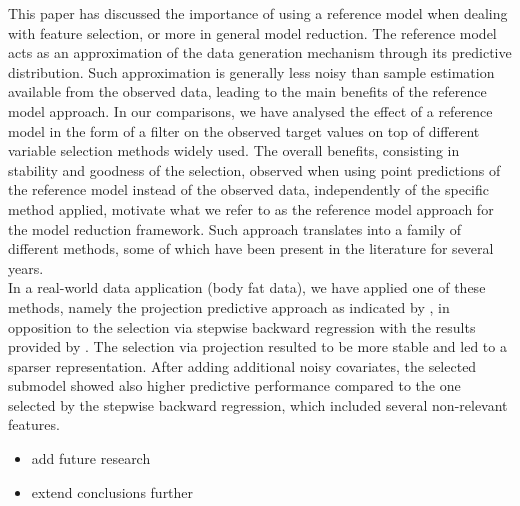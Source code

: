 \documentclass[american,]{article}
\theoremstyle{definition}
\begin{document}
This paper has discussed the importance of using a reference model when dealing with feature selection, or more in general model reduction. The reference model acts as an approximation of the data generation mechanism through its predictive distribution. Such approximation is generally less noisy than sample estimation available from the observed data, leading to the main benefits of the reference model approach. In our comparisons, we have analysed the effect of a reference model in the form of a filter on the observed target values on top of different variable selection methods widely used. The overall benefits, consisting in stability and goodness of the selection, observed when using point predictions of the reference model instead of the observed data, independently of the specific method applied, motivate what we refer to as the reference model approach for the model reduction framework. Such approach translates into a family of different methods, some of which have been present in the literature for several years.
\\
In a real-world data application (body fat data), we have applied one of these methods, namely the projection predictive approach as indicated by \cite{paper:projpred}, in opposition to the selection via stepwise backward regression with the results provided by \cite{paper:bodyfat}. The selection via projection resulted to be more stable and led to a sparser representation. After adding additional noisy covariates, the selected submodel showed also higher predictive performance compared to the one selected by the stepwise backward regression, which included several non-relevant features.

\begin{itemize}
\item add future research
\item extend conclusions further
\end{itemize}





 

\end{document}
